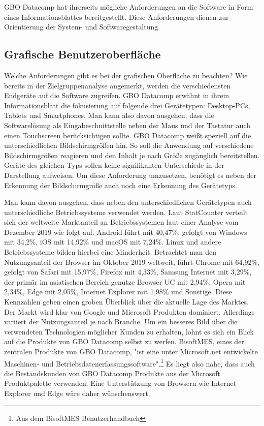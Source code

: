 GBO Datacomp hat ihrerseits mögliche Anforderungen an die Software in Form eines Informationsblattes
bereitgestellt. Diese Anforderungen dienen zur Orientierung der System- und Softwaregestaltung. 

\subsection{Grafische Benutzeroberfläche}
Welche Anforderungen gibt es bei der grafischen Oberfläche zu beachten? Wie bereits
in der Zielgruppenanalyse angemerkt, werden die verschiedensten Endgeräte auf die
Software zugreifen. GBO Datacomp erwähnt in ihrem Informationsblatt die fokusierung auf folgende
drei Gerätetypen: Desktop-PCs, Tablets und Smartphones. Man kann also davon ausgehen, dass die
Softwarelösung als Eingabeschnittstelle neben der Maus und der Tastatur auch einen Touchscreen
berücksichtigen sollte. GBO Datacomp weißt speziell auf die unterschiedlichen Bildschirmgrößen
hin. So soll die Anwendung auf verschiedene Bildschirmgrößen reagieren und den Inhalt je nach
Größe zugänglich bereitstellen. Geräte des gleichen Typs sollen keine signifikanten Unterschiede
in der Darstellung aufweisen. Um diese Anforderung umzusetzen, benötigt es neben der Erkennung
der Bildschirmgröße auch noch eine Erkennung des Gerätetyps.

Man kann davon ausgehen, dass neben den unterschiedlichen Gerätetypen auch unterschiedliche
Betriebssysteme verwendet werden. Laut StatCounter verteilt sich der weltweite Marktanteil
an Betriebssystemen laut einer Analyse vom Dezember 2019 wie folgt auf. Android führt mit
40,47\%, gefolgt von Windows mit 34,2\%, iOS mit 14,92\% und macOS mit 7,24\%. Linux und andere
Betriebssysteme bilden hierbei eine Minderheit.\cite{StatCounterOSMarketShare} Betrachtet man den
Nutzungsanteil der Browser im Oktober 2019 weltweit, führt Chrome mit 64,92\%, gefolgt von Safari mit 15,97\%,
Firefox mit 4,33\%, Samsung Internet mit 3,29\%, der primär im asiatischen Bereich genutze Browser UC
mit 2,94\%, Opera mit 2,34\%, Edge mit 2,05\%, Internet Explorer mit 1,98\% und Sonstige.\cite{StatCounterBrowserMarketShare}
Diese Kennzahlen geben einen groben Überblick über die aktuelle Lage des Marktes. Der Markt wird klar von
Google und Microsoft Produkten dominiert. Allerdings variiert der Nutzungsanteil je nach Branche.
Um ein besseres Bild über die verwendeten Technologien möglicher Kunden zu erhalten,
lohnt es sich ein Blick auf die Produkte von GBO Datacomp selbst zu werfen.
BisoftMES, eines der zentralen Produkte von GBO Datacomp, "ist eine unter Microsoft.net
entwickelte Maschinen- und Betriebsdatenerfassungssoftware".\footnote[1]{Aus dem BisoftMES Benutzerhandbuch\cite[S. 7]{BisoftMESHandbuch}}
Es liegt also nahe, dass auch die Bestandskunden von GBO Datacomp Produkte aus der Microsoft
Produktpalette verwenden. Eine Unterstützung von Browsern wie Internet Explorer und Edge
wäre daher wünschenswert.

